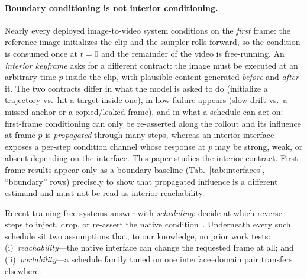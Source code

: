 \documentclass[letterpaper]{article}
\begin{document}
\paragraph{Boundary conditioning is not interior conditioning.}
Nearly every deployed image-to-video system conditions on the
\emph{first} frame: the reference image initializes the clip and the
sampler rolls forward, so the condition is consumed once at $t{=}0$ and
the remainder of the video is free-running. An \emph{interior keyframe}
asks for a different contract: the image must be executed at an
arbitrary time $p$ inside the clip, with plausible content generated
\emph{before} and \emph{after} it. The two contracts differ in what the
model is asked to do (initialize a trajectory vs.\ hit a target inside
one), in how failure appears (slow drift vs.\ a missed anchor or a
copied/leaked frame), and in what a schedule can act on: first-frame
conditioning can only be re-asserted along the rollout and its
influence at frame $p$ is \emph{propagated} through many steps, whereas
an interior interface exposes a per-step condition channel whose
response at $p$ may be strong, weak, or absent depending on the
interface. This paper studies the interior contract. First-frame
results appear only as a boundary baseline
(Tab.~\ref{tab:interfaces}, ``boundary'' rows) precisely to show that
propagated influence is a different estimand and must not be read as
interior reachability.

Recent training-free systems answer with \emph{scheduling}: decide at which
reverse steps to inject, drop, or re-assert the native
condition~\citep{lai2025flexti2v,jang2025frameguidance}. Underneath every
such schedule sit two assumptions that, to our knowledge, no prior work
tests: (i)~\emph{reachability}---the native interface can change the
requested frame at all; and (ii)~\emph{portability}---a schedule family
tuned on one interface--domain pair transfers elsewhere.
\end{document}
